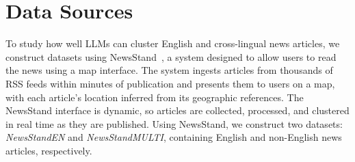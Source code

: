 \section{Data Sources}\label{section:data}

To study how well LLMs can cluster English and cross-lingual news articles, we construct datasets using NewsStand~\cite{Teit08}, a system designed to allow users to read the news using a map interface. 
The system ingests articles from thousands of RSS feeds within minutes of publication and presents them to users on a map, with each article's location inferred from its geographic references. 
The NewsStand interface is dynamic, so articles are collected, processed, and clustered in real time as they are published. 
%
Using NewsStand, we construct two datasets: \emph{NewsStandEN} and \emph{NewsStandMULTI}, containing English and non-English news articles, respectively.

